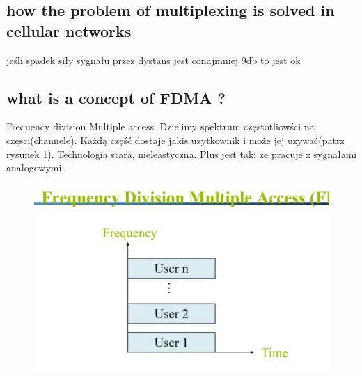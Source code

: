 \subsection{how the problem of multiplexing is solved in cellular networks}
jeśli spadek siły sygnału przez dystans jest conajmniej 9db to jest ok

\subsection{what is a concept of FDMA ?}
Frequency division Multiple access. Dzielimy spektrum częstotliowści na częsci(channele). Każdą część dostaje jakis uzytkownik i może jej uzywać(patrz rysunek \ref{zdj:FDMA}). Technologia stara, nieleastyczna. Plus jest taki ze pracuje z sygnałami analogowymi.
\begin{figure}

\caption{}
\label{zdj:FDMA}
\centering
\includegraphics[width=\textwidth]{zdjecia/FDMA}
\end{figure}

